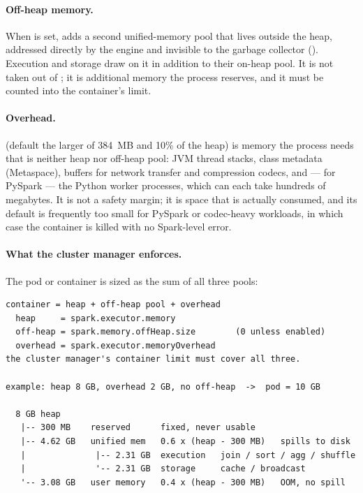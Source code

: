 \paragraph{Off-heap memory.} When  is set,
 adds a second unified-memory pool that lives
outside the heap, addressed directly by the engine and invisible to the garbage
collector (). Execution and storage draw on it in addition to
their on-heap pool. It is not taken out of ; it is
additional memory the process reserves, and it must be counted into the
container's limit.

\paragraph{Overhead.}  (default the larger
of 384~MB and 10\% of the heap) is memory the process needs that is neither heap
nor off-heap pool: JVM thread stacks, class metadata (Metaspace), buffers for
network transfer and compression codecs, and --- for PySpark --- the Python
worker processes, which can each take hundreds of megabytes. It is not a safety
margin; it is space that is actually consumed, and its default is frequently too
small for PySpark or codec-heavy workloads, in which case the container is killed
with no Spark-level error.

\paragraph{What the cluster manager enforces.} The pod or container is sized as
the sum of all three pools:

\begin{lstlisting}[numbers=none,breaklines=false,basicstyle=\footnotesize\ttfamily,caption={An executor's memory, on-heap and off},captionpos=b]
container = heap + off-heap pool + overhead
  heap     = spark.executor.memory
  off-heap = spark.memory.offHeap.size        (0 unless enabled)
  overhead = spark.executor.memoryOverhead
the cluster manager's container limit must cover all three.

example: heap 8 GB, overhead 2 GB, no off-heap  ->  pod = 10 GB

  8 GB heap
   |-- 300 MB    reserved      fixed, never usable
   |-- 4.62 GB   unified mem   0.6 x (heap - 300 MB)   spills to disk
   |              |-- 2.31 GB  execution   join / sort / agg / shuffle
   |              '-- 2.31 GB  storage     cache / broadcast
   '-- 3.08 GB   user memory   0.4 x (heap - 300 MB)   OOM, no spill
\end{lstlisting}

